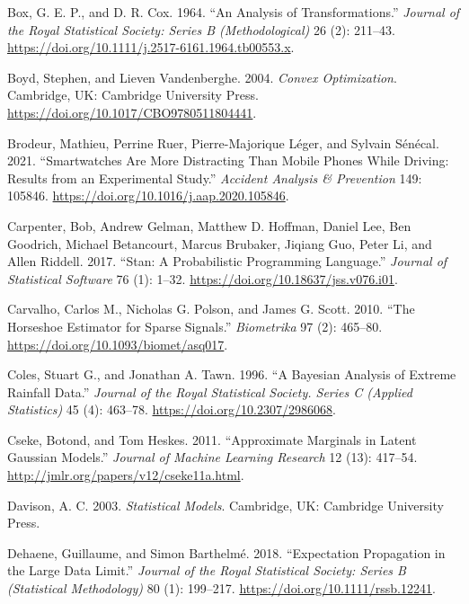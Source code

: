 \documentclass[
  11pt,
  letterpaper,
]{scrbook}
\newlength{\cslhangindent}
\newenvironment{CSLReferences}[2] %
 {\begin{list}{}{%
  \setlength{\itemindent}{0pt}
  \setlength{\leftmargin}{0pt}
  \setlength{\parsep}{0pt}
  \ifodd #1
   \setlength{\leftmargin}{\cslhangindent}
   \setlength{\itemindent}{-1\cslhangindent}
  \fi
  \setlength{\itemsep}{#2\baselineskip}}}
 {\end{list}}
\theoremstyle{plain}
\theoremstyle{plain}
\theoremstyle{definition}
\theoremstyle{definition}
\theoremstyle{definition}
\theoremstyle{plain}
\theoremstyle{remark}
\begin{document}
\begin{CSLReferences}{1}{0}
Box, G. E. P., and D. R. Cox. 1964. {``An Analysis of
Transformations.''} \emph{Journal of the Royal Statistical Society:
Series B (Methodological)} 26 (2): 211--43.
\url{https://doi.org/10.1111/j.2517-6161.1964.tb00553.x}.

Boyd, Stephen, and Lieven Vandenberghe. 2004. \emph{Convex
Optimization}. Cambridge, UK: Cambridge University Press.
\url{https://doi.org/10.1017/CBO9780511804441}.

Brodeur, Mathieu, Perrine Ruer, Pierre-Majorique Léger, and Sylvain
Sénécal. 2021. {``Smartwatches Are More Distracting Than Mobile Phones
While Driving: Results from an Experimental Study.''} \emph{Accident
Analysis \& Prevention} 149: 105846.
\url{https://doi.org/10.1016/j.aap.2020.105846}.

Carpenter, Bob, Andrew Gelman, Matthew D. Hoffman, Daniel Lee, Ben
Goodrich, Michael Betancourt, Marcus Brubaker, Jiqiang Guo, Peter Li,
and Allen Riddell. 2017. {``{Stan}: A Probabilistic Programming
Language.''} \emph{Journal of Statistical Software} 76 (1): 1--32.
\url{https://doi.org/10.18637/jss.v076.i01}.

Carvalho, Carlos M., Nicholas G. Polson, and James G. Scott. 2010.
{``The Horseshoe Estimator for Sparse Signals.''} \emph{Biometrika} 97
(2): 465--80. \url{https://doi.org/10.1093/biomet/asq017}.

Coles, Stuart G., and Jonathan A. Tawn. 1996. {``A {B}ayesian Analysis
of Extreme Rainfall Data.''} \emph{Journal of the Royal Statistical
Society. Series C (Applied Statistics)} 45 (4): 463--78.
\url{https://doi.org/10.2307/2986068}.

Cseke, Botond, and Tom Heskes. 2011. {``Approximate Marginals in Latent
{G}aussian Models.''} \emph{Journal of Machine Learning Research} 12
(13): 417--54. \url{http://jmlr.org/papers/v12/cseke11a.html}.

Davison, A. C. 2003. \emph{Statistical Models}. Cambridge, UK: Cambridge
University Press.

Dehaene, Guillaume, and Simon Barthelmé. 2018. {``Expectation
Propagation in the Large Data Limit.''} \emph{Journal of the Royal
Statistical Society: Series B (Statistical Methodology)} 80 (1):
199--217. \url{https://doi.org/10.1111/rssb.12241}.


\end{CSLReferences}
\end{document}
